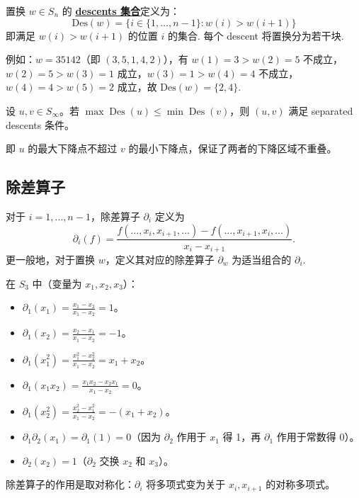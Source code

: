 \begin{Definition}
\label{def:Descents}
置换 $w \in S_n$ 的 \textbf{\underline{descents 集合}}定义为：
$$\mathrm{Des}(w) = \{i \in \{1, \ldots, n-1\} : w(i) > w(i+1)\}$$
即满足 $w(i) > w(i+1)$ 的位置 $i$ 的集合. 每个 descent 将置换分为若干块.

例如：$w = 35142$（即 $(3,5,1,4,2)$），有 $w(1)=3 > w(2)=5$ 不成立，$w(2)=5 > w(3)=1$ 成立，$w(3)=1 > w(4)=4$ 不成立，$w(4)=4 > w(5)=2$ 成立，故 $\mathrm{Des}(w) = \{2, 4\}$.
\end{Definition}

\begin{Definition}
\label{def:SeparatedDescents}
设 $u, v \in S_\infty$。若 $\max \operatorname{Des}(u) \leq \min \operatorname{Des}(v)$，则 $(u, v)$ 满足 separated descents 条件。

即 $u$ 的最大下降点不超过 $v$ 的最小下降点，保证了两者的下降区域不重叠。
\end{Definition}

\subsection{除差算子}
\label{sec:DividedDifference}

\begin{Definition}
\label{def:DividedDifference}
对于 $i = 1, \ldots, n-1$，除差算子 $\partial_i$ 定义为
\begin{equation}
\partial_i(f) = \frac{f(\ldots, x_i, x_{i+1}, \ldots) - f(\ldots, x_{i+1}, x_i, \ldots)}{x_i - x_{i+1}}.
\end{equation}
更一般地，对于置换 $w$，定义其对应的除差算子 $\partial_w$ 为适当组合的 $\partial_i$.
\end{Definition}

\begin{Example}[除差算子的例子]
\label{ex:DividedDifference}
在 $S_3$ 中（变量为 $x_1, x_2, x_3$）：
\begin{itemize}
\item $\partial_1(x_1) = \frac{x_1 - x_2}{x_1 - x_2} = 1$。
\item $\partial_1(x_2) = \frac{x_2 - x_1}{x_1 - x_2} = -1$。
\item $\partial_1(x_1^2) = \frac{x_1^2 - x_2^2}{x_1 - x_2} = x_1 + x_2$。
\item $\partial_1(x_1 x_2) = \frac{x_1 x_2 - x_2 x_1}{x_1 - x_2} = 0$。
\item $\partial_1(x_2^2) = \frac{x_2^2 - x_1^2}{x_1 - x_2} = -(x_1 + x_2)$。
\item $\partial_1 \partial_2(x_1) = \partial_1(1) = 0$（因为 $\partial_2$ 作用于 $x_1$ 得 1，再 $\partial_1$ 作用于常数得 0）。
\item $\partial_2(x_2) = 1$（$\partial_2$ 交换 $x_2$ 和 $x_3$）。
\end{itemize}
除差算子的作用是取对称化：$\partial_i$ 将多项式变为关于 $x_i, x_{i+1}$ 的对称多项式。
\end{Example}

